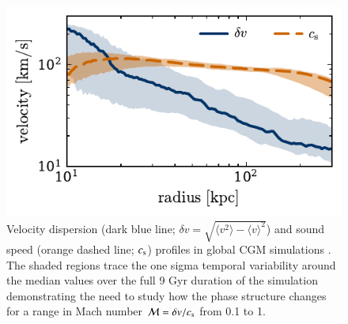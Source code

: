 \documentclass[11pt,letterpaper,english]{article}
\begin{document}



\begin{figure}[t]
    \centering
    \begin{minipage}{0.6\textwidth}
        \includegraphics[width=\textwidth]{velocities.pdf} 
    \end{minipage}\hfill
    \begin{minipage}{0.4\textwidth}
        \centering
\caption{ Velocity dispersion (dark blue line; $\delta v = \sqrt{\langle v^2 \rangle - \langle v \rangle^2}$) and sound speed (orange dashed line; $c_{\rm s}$) profiles in global CGM simulations \cite{Fielding17}. The shaded regions trace the one sigma temporal variability around the median values over the full 9 Gyr duration of the simulation demonstrating the need to study how the phase structure changes for a range in Mach number $\mathcal{M} = \delta v /  c_{\rm s}$ from 0.1 to 1. \label{fig:velocities}} 
\end{minipage}
\end{figure}
\end{document}
